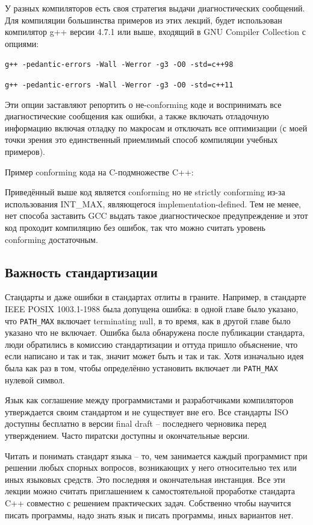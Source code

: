 \documentclass[a4paper,12pt,oneside]{article}
\begin{document}
У разных компиляторов есть своя стратегия выдачи диагностических сообщений. Для компиляции большинства примеров из этих лекций, будет использован компилятор g++ версии 4.7.1 или выше, входящий в GNU Compiler Collection с опциями: 

\lstinline!g++ -pedantic-errors -Wall -Werror -g3 -O0 -std=c++98!

\lstinline!g++ -pedantic-errors -Wall -Werror -g3 -O0 -std=c++11!

Эти опции заставляют репортить о не-conforming коде и воспринимать все диагностические сообщения как ошибки, а также включать отладочную информацию включая отладку по макросам и отключать все оптимизации (с моей точки зрения это единственный приемлимый способ компиляции учебных примеров).

Пример conforming кода на C-подмножестве C++:



Приведённый выше код является conforming но не strictly conforming из-за использования INT\_MAX, являющегося implementation-defined. Тем не менее, нет способа заставить GCC выдать такое диагностическое предупреждение и этот код проходит компиляцию без ошибок, так что можно считать уровень conforming достаточным.

\subsection{Важность стандартизации}

Стандарты и даже ошибки в стандартах отлиты в граните. Например, в стандарте IEEE POSIX 1003.1-1988 была допущена ошибка: в одной главе было указано, что \lstinline!PATH_MAX! включает terminating null, в то время, как в другой главе было указано что не включает. Ошибка была обнаружена после публикации стандарта, люди обратились в комиссию стандартизации и оттуда пришло объяснение, что если написано и так и так, значит может быть и так и так. Хотя изначально идея была как раз в том, чтобы определённо установить включает ли \lstinline!PATH_MAX! нулевой символ.

Язык как соглашение между программистами и разработчиками компиляторов утверждается своим стандартом и не существует вне его. Все стандарты ISO доступны бесплатно в версии final draft – последнего черновика перед утверждением. Часто пиратски доступны и окончательные версии.

Читать и понимать стандарт языка – то, чем занимается каждый программист при решении любых спорных вопросов, возникающих у него относительно тех или иных языковых средств. Это последняя и окончательная инстанция.
Все эти лекции можно считать приглашением к самостоятельной проработке стандарта C++ совместно с решением практических задач. Собственно чтобы научится писать программы, надо знать язык и писать программы, иных вариантов нет.
\end{document}

